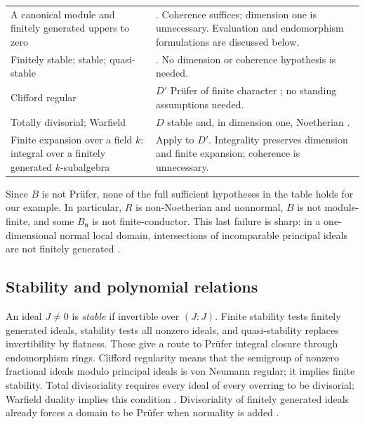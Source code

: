 \documentclass[11pt,reqno]{amsart}
\numberwithin{equation}{section}
\theoremstyle{plain}
\begin{document}
\begin{longtable}{@{}>{\raggedright\arraybackslash}p{}
                    >{\raggedright\arraybackslash}p{}@{}}
\addlinespace
A canonical module and finitely generated uppers to zero
& \cite[Prop.~4.14]{GlazVasconcelos1984}.
Coherence suffices; dimension one is unnecessary. Evaluation and
endomorphism formulations are discussed below.\\
\addlinespace
Finitely stable; stable; quasi-stable
& \cite[Prop.~3.4, Cor.~3.5]{PicozzaTartarone2010}.
No dimension or coherence hypothesis is needed.\\
\addlinespace
Clifford regular
& $D'$ Pr\"ufer of finite character
\cite[Prop.~3.4, Cor.~4.8]{Bazzoni2011}; no standing assumptions needed.\\
\addlinespace
Totally divisorial; Warfield
& $D$ stable and, in dimension one, Noetherian
\cite[pp.~263--264, Lemmas~3.2--3.3]{Olberding2001}.\\
\addlinespace
Finite expansion over a field $k$: integral over a finitely generated
$k$-subalgebra
& Apply \cite[Thm.~3.5]{Steiner2026} to $D'$.
Integrality preserves dimension and finite expansion; coherence is
unnecessary.\\
\end{longtable}
\endgroup

Since $B$ is not Pr\"ufer, none of the full sufficient hypotheses in
the table holds for our example. In particular, $R$ is non-Noetherian
and nonnormal, $B$ is not module-finite, and some $B_{\mathfrak n}$ is
not finite-conductor. This last failure is sharp: in a one-dimensional
normal local domain, intersections of incomparable principal ideals
are not finitely generated \cite[Rem.~2.2]{GuerrieriLoper2021}.

\subsection{Stability and polynomial relations}
An ideal $J\ne0$ is \emph{stable} if invertible over $(J:J)$.
Finite stability tests finitely generated ideals, stability tests all
nonzero ideals, and quasi-stability replaces invertibility by flatness.
These give a route to Pr\"ufer integral closure through endomorphism rings.
Clifford regularity means that the semigroup of nonzero fractional ideals
modulo principal ideals is von Neumann regular; it implies finite
stability. Total divisoriality requires every ideal of every overring to
be divisorial; Warfield duality implies this condition
\cite{Bazzoni2011,Olberding2001}. Divisoriality of finitely generated
ideals already forces a domain to be Pr\"ufer when normality is added
\cite[Cor.~3.2]{TamekkanteAssaadBouba2019}.
\end{document}
